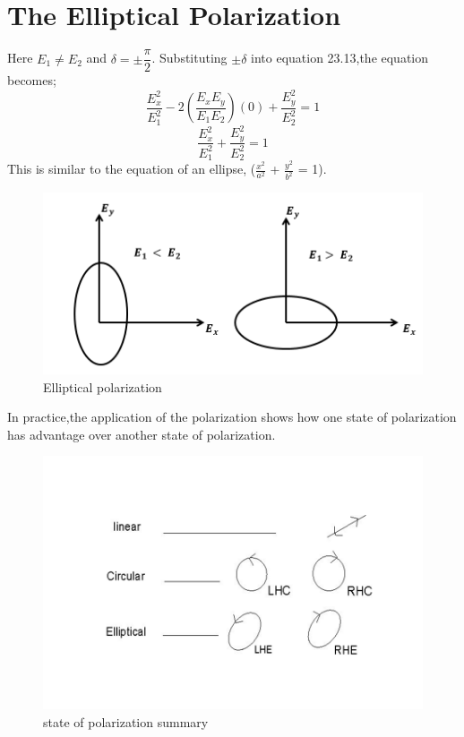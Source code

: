 \section{The Elliptical Polarization}
Here $E_1\neq E_2$ and $\delta = \pm \dfrac{\pi}{2} $. Substituting $\pm \delta$ into equation 23.13,the equation becomes;
\begin{equation}
\frac{E_{x}^2}{E_{1}^2} -2(\frac{E_{x}E_{y}}{E_{1}E_{2}})(0) + \frac{E_{y}^2}{E_{2}^2} = 1
\end{equation}
\begin{equation}
\frac{E_{x}^2}{E_{1}^2} + \frac{E_{y}^2}{E_{2}^2} = 1
\end{equation}
This is similar to the equation of an ellipse, ($\frac{x^2}{a^2}$ + $\frac{y^2}{b^2}$ = 1).
\begin{figure}[h]
\centering
\includegraphics[width=1\linewidth]{./graphics/elliptical_polarization2}
\caption{Elliptical polarization}
\end{figure}

In practice,the application of the polarization shows how one state of polarization has advantage over another state of polarization.
\begin{figure}[h]
\centering
\includegraphics[width=1\linewidth]{./graphics/eee}
\caption{state of polarization summary}
\end{figure}

